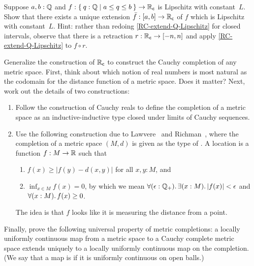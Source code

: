 \begin{ex} \label{RC-Lipschitz-on-interval} Suppose $a, b : \mathbb{Q}$ and $f : \setof{ q : \Q |
    a \leq q \leq b } \to \RC$ is Lipschitz with constant~$L$. Show that there exists a unique
  extension $\bar{f} : [a,b] \to \mathbb{R}_\mathsf{c}$ of $f$ which is Lipschitz with
  constant~$L$. Hint: rather than redoing \cref{RC-extend-Q-Lipschitz} for closed
  intervals, observe that there is a retraction $r : \mathbb{R}_\mathsf{c} \to [-n,n]$ and apply
  \cref{RC-extend-Q-Lipschitz} to $f \circ r$.
\end{ex}

\begin{ex} \label{ex:metric-completion}
  Generalize the construction of $\mathbb{R}_\mathsf{c}$ to construct the Cauchy completion of any metric space. First, think about which notion of real numbers is most natural as the codomain for the distance function of a metric space. Does it matter? Next, work out the details of two constructions:
  \begin{enumerate}
  \item Follow the construction of Cauchy reals to define the completion of a metric space as an inductive-inductive type closed under limits of Cauchy sequences.
  \item Use the following construction due to Lawvere~\cite{lawvere:metric-spaces} and Richman~\cite{Richman00thefundamental}, where the completion of a metric space $(M, d)$ is given as the type of .
    A location is a function $f : M \to \mathbb{R}$ such that
    \begin{enumerate}
    \item $f(x) \geq |f(y) - d(x,y)|$ for all $x, y : M$, and
    \item $\inf_{x \in M} f(x) = 0$, by which we mean $\fall{\epsilon : \Qp} \exis{x : M} |f(x)| < \epsilon$ and $\fall{x : M} f(x) \geq 0$.
    \end{enumerate}
    The idea is that $f$ looks like it is measuring the distance from a point.
  \end{enumerate}
  Finally, prove the following universal property of metric completions: a locally uniformly continuous map from a metric space to a Cauchy complete metric space extends uniquely to a locally uniformly continuous map on the completion. (We say that a map is 
  if it is uniformly continuous on open balls.)
\end{ex}

